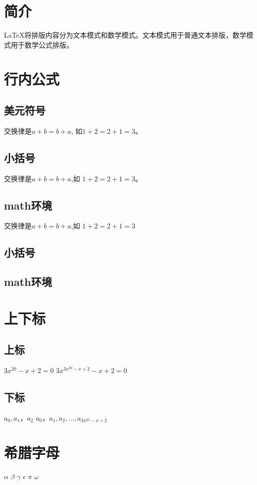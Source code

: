 \documentclass{article}%
\begin{document}
	\section{简介}
	\LaTeX{}将排版内容分为文本模式和数学模式。文本模式用于普通文本排版，数学模式用于数学公式排版。
	\section{行内公式}
	\subsection{美元符号}
	交换律是$a+b=b+a$, 如$1+2=2+1=3$。
	\subsection{小括号}
	交换律是\(a+b=b+a\),如 \(1+2=2+1=3\)。
	\subsection{math环境}
	交换律是\begin{math}a+b=b+a\end{math},如
	\begin{math}1+2=2+1=3 \end{math}
	\subsection{小括号}
	\subsection{math环境}
	\section{上下标}
	\subsection{上标}
	$3x^{20} - x + 2 = 0$
	$3x^{3x^{20} - x + 2} - x + 2 = 0$
	\subsection{下标}
	$a_ 0, a_1，a_ 2$
	$a_ 0，a_1, a_2,..., a_{3x^{20} - x + 2}$
	\section{希腊字母}
	$\alpha$
	$\beta$
	$\gamma$
	$\epsilon$
	$\pi$
	$\omega$
	
\end{document}
